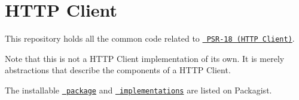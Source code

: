 \chapter{HTTP Client}
\hypertarget{md_public_2glpi_2vendor_2psr_2http-client_2_r_e_a_d_m_e}{}\label{md_public_2glpi_2vendor_2psr_2http-client_2_r_e_a_d_m_e}
This repository holds all the common code related to \href{http://www.php-fig.org/psr/psr-18}{\texttt{ PSR-\/18 (HTTP Client)}}.

Note that this is not a HTTP Client implementation of its own. It is merely abstractions that describe the components of a HTTP Client.

The installable \href{https://packagist.org/packages/psr/http-client}{\texttt{ package}} and \href{https://packagist.org/providers/psr/http-client-implementation}{\texttt{ implementations}} are listed on Packagist. 